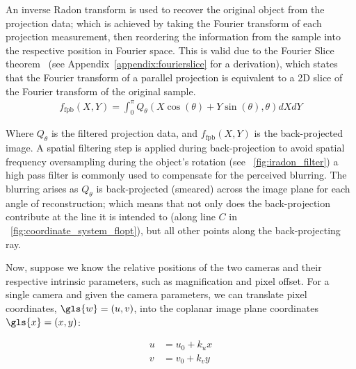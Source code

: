 An inverse \gls{Radon transform} is used to recover the original object from the projection data; which is achieved by taking the \gls{Fourier transform} of each projection measurement, then reordering the information from the sample into the respective position in Fourier space.
This is valid due to the Fourier Slice theorem~\cite{bracewellStripIntegrationRadio1956} (see Appendix~\ref{appendix:fourierslice} for a derivation), which states that the \gls{Fourier transform} of a parallel projection is equivalent to a 2D slice of the Fourier transform of the original sample.
\begin{align}
f_{\text{fpb}}(X,Y) = \int_{0}^{\pi} Q_\theta (X\cos(\theta)+Y\sin(\theta),\theta)dXdY
\end{align}

Where \(Q_\theta \) is the filtered projection data, and \(f_{\text{fpb}}(X,Y)\) is the back-projected image.
A spatial filtering step is applied during back-projection to avoid spatial frequency oversampling during the object’s rotation (see \figurename~\ref{fig:iradon_filter})
a high pass filter is commonly used to compensate for the perceived blurring.
The blurring arises as \(Q_\theta \) is back-projected (smeared) across the image plane for each angle of reconstruction; which means that not only does the back-projection contribute at the line it is intended to (along line \(C\) in \figurename~\ref{fig:coordinate_system_flopt}), but all other points along the back-projecting ray.


Now, suppose we know the relative positions of the two cameras and their respective intrinsic parameters, such as magnification and pixel offset.
For a single camera and given the camera parameters, we can translate pixel coordinates, \(\gls{w} = (u, v)\), into the coplanar image plane coordinates \(\gls{x}=(x, y)\):

\begin{align}
    u &= u_0 + k_u x \\
    v &= v_0 + k_v y
\end{align}

